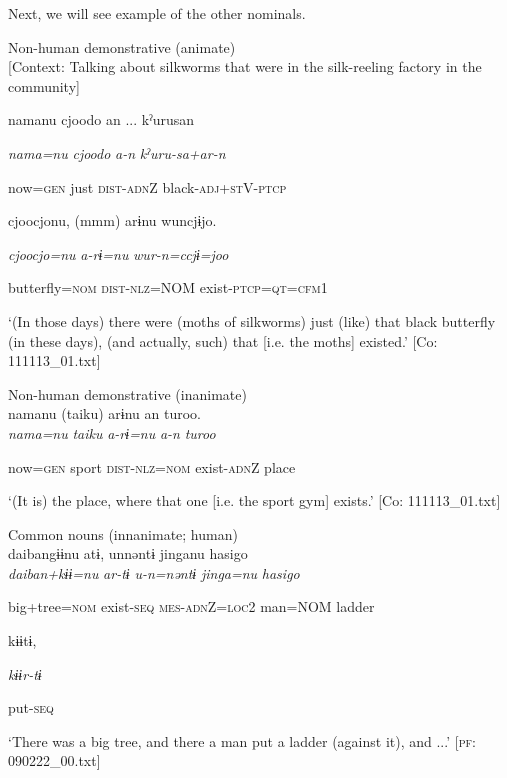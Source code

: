   Next, we will see example of the other nominals.

\ea\label{ex:6-118}
\ea Non-human demonstrative (animate)\\{}
[Context: Talking about silkworms that were in the silk-reeling factory in the community]

{\TM}
\gll namanu  cjoodo  an ...  kˀurusan

      \textit{nama=nu}  \textit{cjoodo}  \textit{a-n}  \textit{kˀuru-sa+ar-n}

      now=\textsc{gen}  just  \textsc{dist}-\textsc{adn}Z  black-\textsc{adj}+\textsc{st}V-\textsc{ptcp}

      cjoocjonu,  (mmm)  arɨnu  wuncjɨjo.

      \textit{cjoocjo=nu}    \textit{a-rɨ=nu}  \textit{wur-n=ccjɨ=joo}

      butterfly=\textsc{nom}    \textsc{dist}-\textsc{nlz}=NOM  exist-\textsc{ptcp}=\textsc{qt}=\textsc{cfm}1

\glt ‘(In those days) there were (moths of silkworms) just (like) that black butterfly (in these days), (and actually, such) that [i.e. the moths] existed.’ [Co: 111113\_01.txt]
\z

 \ex Non-human demonstrative (inanimate)\\
{\TM}
\gll  namanu  ({\textbar}taiku{\textbar})  arɨnu  an  turoo.\\

      \textit{nama=nu}  \textit{taiku}  \textit{a-rɨ=nu}  \textit{a-n}  \textit{turoo}

      now=\textsc{gen}  sport  \textsc{dist}-\textsc{nlz}=\textsc{nom}  exist-\textsc{adn}Z  place

\glt ‘(It is) the place, where that one [i.e. the sport gym] exists.’ [Co: 111113\_01.txt]
\z

 \ex Common nouns (innanimate; human)\\
{\TM}
\gll  daibangɨɨnu  atɨ,  unnəntɨ  jinganu  {\textbar}hasigo{\textbar}\\

      \textit{daiban+kɨɨ=nu}  \textit{ar-tɨ}  \textit{u-n=nəntɨ}  \textit{jinga=nu}  \textit{hasigo}

      big+tree=\textsc{nom}  exist-\textsc{seq}  \textsc{mes}-\textsc{adn}Z=\textsc{loc}2  man=NOM  ladder

      kɨɨtɨ,

      \textit{kɨɨr-tɨ}

      put-\textsc{seq}

\glt ‘There was a big tree, and there a man put a ladder (against it), and ...’ [\textsc{pf}: 090222\_00.txt]
\z

